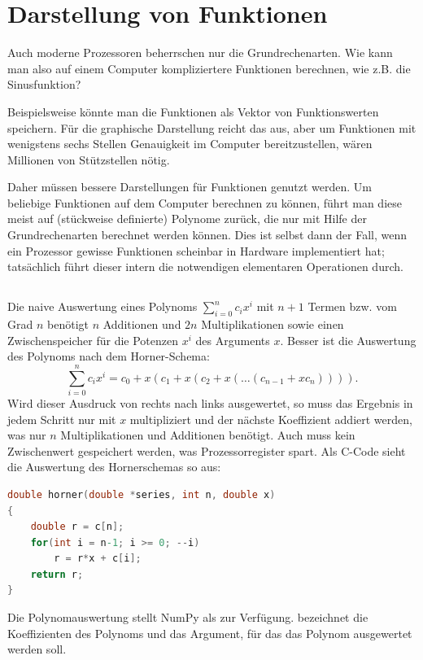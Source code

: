 % 

\chapter{Darstellung von Funktionen}

Auch moderne Prozessoren beherrschen nur die Grundrechenarten. Wie
kann man also auf einem Computer kompliziertere Funktionen berechnen,
wie z.B. die Sinusfunktion?

Beispielsweise könnte man die Funktionen als Vektor von
Funktionswerten speichern. Für die graphische Darstellung reicht das
aus, aber um Funktionen mit wenigstens sechs Stellen Genauigkeit im
Computer bereitzustellen, wären Millionen von Stützstellen nötig.

Daher müssen bessere Darstellungen für Funktionen genutzt werden.  Um
beliebige Funktionen auf dem Computer berechnen zu können, führt man
diese meist auf (stückweise definierte) Polynome zurück, die nur mit
Hilfe der Grundrechenarten berechnet werden können. Dies ist selbst
dann der Fall, wenn ein Prozessor gewisse Funktionen scheinbar in
Hardware implementiert hat; tatsächlich führt dieser intern die
notwendigen elementaren Operationen durch.

\section{}
\label{sec:horner}

Die naive Auswertung eines Polynoms $\sum_{i=0}^{n} c_ix^{i}$ mit
$n+1$ Termen bzw. vom Grad $n$ benötigt $n$ Additionen und $2n$
Multiplikationen sowie einen Zwischenspeicher für die Potenzen $x^i$
des Arguments $x$. Besser ist die Auswertung des Polynoms nach dem
Horner-Schema:
\begin{equation}
  \label{eq:horner}
  \sum_{i=0}^{n} c_ix^{i} = c_0 + x(c_1 + x(c_2 + x(\ldots (c_{n-1} + x c_{n})))).
\end{equation}
Wird dieser Ausdruck von rechts nach links ausgewertet, so muss das
Ergebnis in jedem Schritt nur mit $x$ multipliziert und der nächste
Koeffizient addiert werden, was nur $n$ Multiplikationen und
Additionen benötigt. Auch muss kein Zwischenwert gespeichert werden,
was Prozessorregister spart. Als C-Code sieht die Auswertung des
Hornerschemas so aus:
\begin{lstlisting}[language=C]
double horner(double *series, int n, double x)
{
    double r = c[n];
    for(int i = n-1; i >= 0; --i)
        r = r*x + c[i];
    return r;
}
\end{lstlisting}
\sloppypar Die Polynomauswertung stellt NumPy als
 zur Verfügung.  bezeichnet die
Koeffizienten des Polynoms und  das Argument, für das das
Polynom ausgewertet werden soll.

